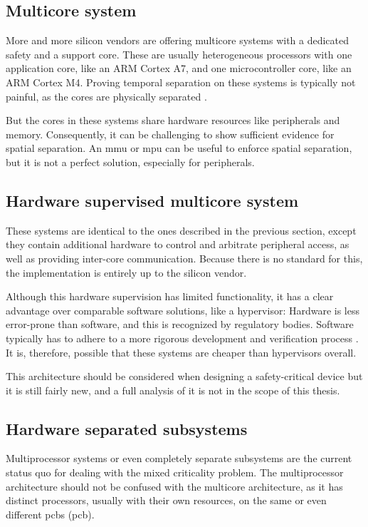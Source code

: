 \subsection{Multicore system}
More and more silicon vendors are offering multicore systems with a dedicated safety and a support core. These are usually heterogeneous processors with one application core, like an ARM Cortex A7, and one microcontroller core, like an ARM Cortex M4. Proving temporal separation on these systems is typically not painful, as the cores are physically separated \cite{wittenstein2017temporal}. 

But the cores in these systems share hardware resources like peripherals and memory. Consequently, it can be challenging to show sufficient evidence for spatial separation. An \acrshort{mmu} or \acrshort{mpu} can be useful to enforce spatial separation, but it is not a perfect solution, especially for peripherals.
\subsection{Hardware supervised multicore system}
These systems are identical to the ones described in the previous section, except they contain additional hardware to control and arbitrate peripheral access, as well as providing inter-core communication.
Because there is no standard for this, the implementation is entirely up to the silicon vendor. 

Although this hardware supervision has limited functionality, it has a clear advantage over comparable software solutions, like a hypervisor: Hardware is less error-prone than software, and this is recognized by regulatory bodies. Software typically has to adhere to a more rigorous development and verification process \cite{IEC.2000-3}. It is, therefore, possible that these systems are cheaper than hypervisors overall. 

This architecture should be considered when designing a safety-critical device but it is still fairly new, and a full analysis of it is not in the scope of this thesis.
\subsection{Hardware separated subsystems \label{HSS}}
Multiprocessor systems or even completely separate subsystems are the current status quo for dealing with the mixed criticality problem. The multiprocessor architecture should not be confused with the multicore architecture, as it has distinct processors, usually with their own resources, on the same or even different \acrlong{pcb}s (\acrshort{pcb}).

